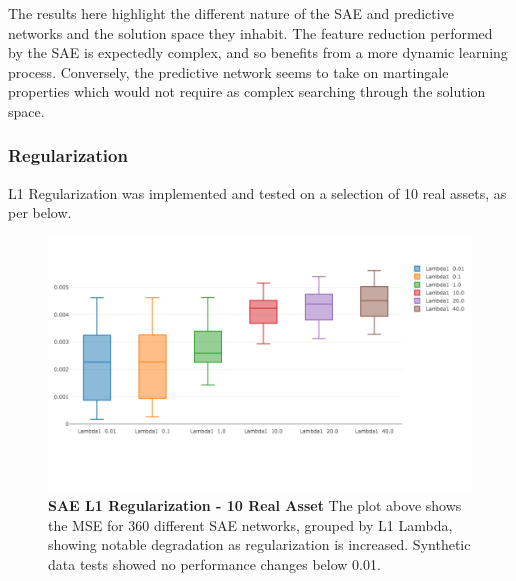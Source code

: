 \documentclass[a4paper,11pt,oneside]{article}
\theoremstyle{plain}
\theoremstyle{definition}
\begin{document}
The results here highlight the different nature of the SAE and predictive networks and the solution space they inhabit. The feature reduction performed by the SAE is expectedly complex, and so benefits from a more dynamic learning process. Conversely, the predictive network seems to take on martingale properties which would not require as complex searching through the solution space.


\subsubsection{Regularization}


L1 Regularization was implemented and tested on a selection of 10 real assets, as per below.

\begin{figure}[H]
	\centering \includegraphics[scale=0.3]{images/iteration_three/it3_l1reg_sae.png}
	\caption{\textbf{SAE L1 Regularization - 10 Real Asset} 
		\newline The plot above shows the MSE for 360 different SAE networks, grouped by L1 Lambda, showing notable degradation as regularization is increased. Synthetic data tests showed no performance changes below 0.01.}
	\label{figure-results-it3_l1reg_sae}
\end{figure}		

\end{document}

